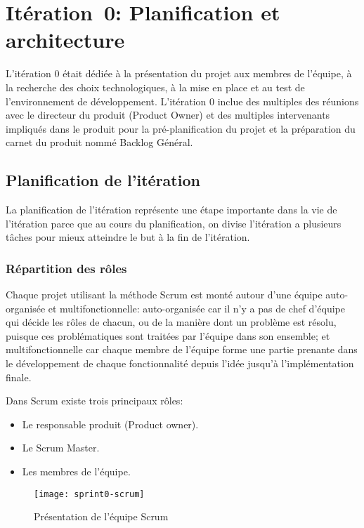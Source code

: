 \chapter{Itération~0: Planification et architecture}
\label{sec:sprint0}

L'itération 0 était dédiée à la présentation du projet aux membres de l'équipe,
à la recherche des choix technologiques, à la mise en place et au test de
l'environnement de développement. L'itération 0 inclue des multiples des
réunions avec le directeur du produit (Product Owner) et des multiples
intervenants impliqués dans le produit pour la pré-planification du projet et
la préparation du carnet du produit nommé Backlog Général.

\section{Planification de l'itération}

La planification de l'itération représente une étape importante dans la vie de
l'itération parce que au cours du planification, on divise l'itération a
plusieurs tâches pour mieux atteindre le but à la fin de l'itération.

\subsection{Répartition des rôles}

Chaque projet utilisant la méthode Scrum est monté autour d'une équipe
auto-organisée et multifonctionnelle: auto-organisée car il n'y a pas de chef
d'équipe qui décide les rôles de chacun, ou de la manière dont un problème est
résolu, puisque ces problématiques sont traitées par l'équipe dans son
ensemble; et multifonctionnelle car chaque membre de l'équipe forme une partie
prenante dans le développement de chaque fonctionnalité depuis l'idée jusqu'à
l'implémentation finale.

Dans Scrum existe trois principaux rôles:

\begin{itemize}
    \item Le responsable produit (Product owner).
    \item Le Scrum Master.
    \item Les membres de l'équipe.
\end{itemize}

\begin{figure}[!h]
    \centering
    \texttt{[image: sprint0-scrum]}
    \caption{Présentation de l'équipe Scrum}
    \label{fig:sprint0-scrum}
\end{figure}

